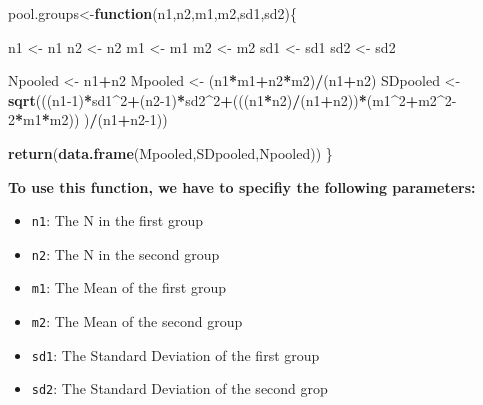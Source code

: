 \documentclass[]{book}
\newenvironment{Shaded}{\begin{snugshade}}{\end{snugshade}}
\newcommand{\ControlFlowTok}[1]{\textcolor[rgb]{0.13,0.29,0.53}{\textbf{#1}}}
\newcommand{\DecValTok}[1]{\textcolor[rgb]{0.00,0.00,0.81}{#1}}
\newcommand{\KeywordTok}[1]{\textcolor[rgb]{0.13,0.29,0.53}{\textbf{#1}}}
\newcommand{\NormalTok}[1]{#1}
\newcommand{\OperatorTok}[1]{\textcolor[rgb]{0.81,0.36,0.00}{\textbf{#1}}}
\newcommand{\StringTok}[1]{\textcolor[rgb]{0.31,0.60,0.02}{#1}}
\providecommand{\tightlist}{%
  \setlength{\itemsep}{0pt}\setlength{\parskip}{0pt}}
\begin{document}
\begin{Shaded}
\begin{Highlighting}[]
\NormalTok{pool.groups<-}\ControlFlowTok{function}\NormalTok{(n1,n2,m1,m2,sd1,sd2)\{}

\NormalTok{n1 <-}\StringTok{ }\NormalTok{n1}
\NormalTok{n2 <-}\StringTok{ }\NormalTok{n2}
\NormalTok{m1 <-}\StringTok{ }\NormalTok{m1}
\NormalTok{m2 <-}\StringTok{ }\NormalTok{m2}
\NormalTok{sd1 <-}\StringTok{ }\NormalTok{sd1}
\NormalTok{sd2 <-}\StringTok{ }\NormalTok{sd2}

\NormalTok{Npooled <-}\StringTok{ }\NormalTok{n1}\OperatorTok{+}\NormalTok{n2}
\NormalTok{Mpooled <-}\StringTok{ }\NormalTok{(n1}\OperatorTok{*}\NormalTok{m1}\OperatorTok{+}\NormalTok{n2}\OperatorTok{*}\NormalTok{m2)}\OperatorTok{/}\NormalTok{(n1}\OperatorTok{+}\NormalTok{n2)}
\NormalTok{SDpooled <-}\StringTok{ }\KeywordTok{sqrt}\NormalTok{(((n1}\DecValTok{-1}\NormalTok{)}\OperatorTok{*}\NormalTok{sd1}\OperatorTok{^}\DecValTok{2}\OperatorTok{+}\NormalTok{(n2}\DecValTok{-1}\NormalTok{)}\OperatorTok{*}\NormalTok{sd2}\OperatorTok{^}\DecValTok{2}\OperatorTok{+}\NormalTok{(((n1}\OperatorTok{*}\NormalTok{n2)}\OperatorTok{/}\NormalTok{(n1}\OperatorTok{+}\NormalTok{n2))}\OperatorTok{*}\NormalTok{(m1}\OperatorTok{^}\DecValTok{2}\OperatorTok{+}\NormalTok{m2}\OperatorTok{^}\DecValTok{2-2}\OperatorTok{*}\NormalTok{m1}\OperatorTok{*}\NormalTok{m2))     )}\OperatorTok{/}\NormalTok{(n1}\OperatorTok{+}\NormalTok{n2}\DecValTok{-1}\NormalTok{))}

\KeywordTok{return}\NormalTok{(}\KeywordTok{data.frame}\NormalTok{(Mpooled,SDpooled,Npooled))}
\NormalTok{\}}
\end{Highlighting}
\end{Shaded}

\textbf{To use this function, we have to specifiy the following parameters:}

\begin{itemize}
\tightlist
\item
  \texttt{n1}: The N in the first group
\item
  \texttt{n2}: The N in the second group
\item
  \texttt{m1}: The Mean of the first group
\item
  \texttt{m2}: The Mean of the second group
\item
  \texttt{sd1}: The Standard Deviation of the first group
\item
  \texttt{sd2}: The Standard Deviation of the second grop
\end{itemize}
\end{document}
